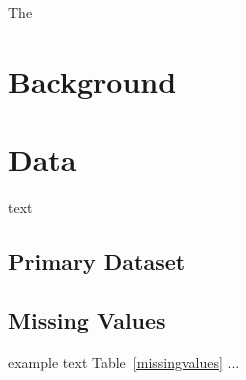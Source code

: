 \documentclass[11pt, a4paper]{article}
\begin{document}
\setcounter{page}{1}

\normalsize
The

















\pagebreak 
\section{Background}






















\pagebreak 
\section{Data}


text




\subsection{Primary Dataset}


















\subsection{Missing Values}






example text Table~\ref{missingvalues} ...
\end{document}
